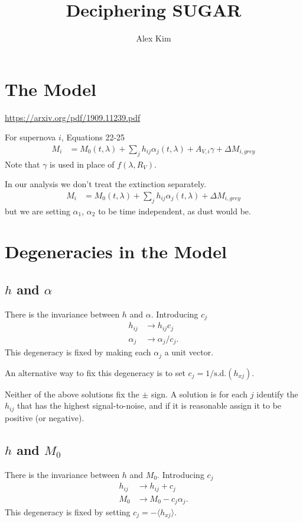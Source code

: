 \documentclass[11pt, oneside]{article}   	%
\title{Deciphering SUGAR}
\author{Alex Kim}
\begin{document}
\section{The Model}
\url{https://arxiv.org/pdf/1909.11239.pdf}

For supernova $i$, Equations 22-25
\begin{align*}
M_i &= M_0(t,\lambda) + \sum_j h_{ij} \alpha_j(t,\lambda) + A_{V,i} \gamma+ \Delta M_{i, grey}
\end{align*}
Note that $\gamma$ is used in place of $ f(\lambda, R_V)$.

In our analysis we don't treat the extinction separately.
\begin{align*}
M_i &= M_0(t,\lambda) + \sum_j h_{ij} \alpha_j(t,\lambda) + \Delta M_{i, grey}
\end{align*}
but we are setting $\alpha_1$, $\alpha_2$ to be time independent, as dust would be.

\section{Degeneracies in the Model}
\subsection{$h$ and $\alpha$}
There is the invariance  between $h$ and $\alpha$.  Introducing $c_j$
\begin{align*}
 h_{ij} &\rightarrow  h_{ij} c_j\\
 \alpha_j  & \rightarrow  \alpha_j/c_j.
\end{align*}
This degeneracy is fixed by making each $\alpha_j$ a unit vector.

An alternative way to fix this degeneracy is to set $c_j = 1/\text{s.d.}(h_{xj})$.

Neither of the above solutions fix the $\pm$ sign.  A solution is for each $j$
identify the $h_{ij}$ that has the highest signal-to-noise, and if it is reasonable
assign it to be positive (or negative).



\subsection{$h$ and $M_0$}
There is the invariance  between $h$ and $M_0$.  Introducing $c_j$
\begin{align*}
 h_{ij} &\rightarrow  h_{ij} + c_j\\
 M_0 & \rightarrow  M_0 - c_j \alpha_j.
\end{align*}
This degeneracy is fixed by setting $c_j = -\langle h_{xj} \rangle$.
\end{document}
